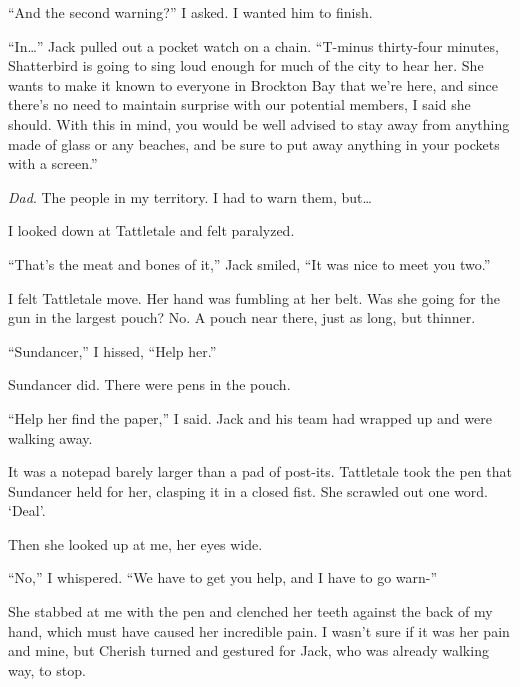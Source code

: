 ``And the second warning?'' I asked.  I wanted him to finish.



``In\ldots'' Jack pulled out a pocket watch on a chain. ``T-minus thirty-four minutes, Shatterbird is going to sing loud enough for much of the city to hear her.  She wants to make it known to everyone in Brockton Bay that we're here, and since there's no need to maintain surprise with our potential members, I said she should.  With this in mind, you would be well advised to stay away from anything made of glass or any beaches, and be sure to put away anything in your pockets with a screen.''



\emph{Dad}.  The people in my territory.  I had to warn them, but\ldots



I looked down at Tattletale and felt paralyzed.



``That's the meat and bones of it,'' Jack smiled, ``It was nice to meet you two.''



I felt Tattletale move.  Her hand was fumbling at her belt.  Was she going for the gun in the largest pouch?  No.  A pouch near there, just as long, but thinner.



``Sundancer,'' I hissed, ``Help her.''



Sundancer did.  There were pens in the pouch.



``Help her find the paper,'' I said.  Jack and his team had wrapped up and were walking away.



It was a notepad barely larger than a pad of post-its.  Tattletale took the pen that Sundancer held for her, clasping it in a closed fist.  She scrawled out one word.  `Deal'.



Then she looked up at me, her eyes wide.



``No,'' I whispered.  ``We have to get you help, and I have to go warn-''



She stabbed at me with the pen and clenched her teeth against the back of my hand, which must have caused her incredible pain.  I wasn't sure if it was her pain and mine, but Cherish turned and gestured for Jack, who was already walking way, to stop.



